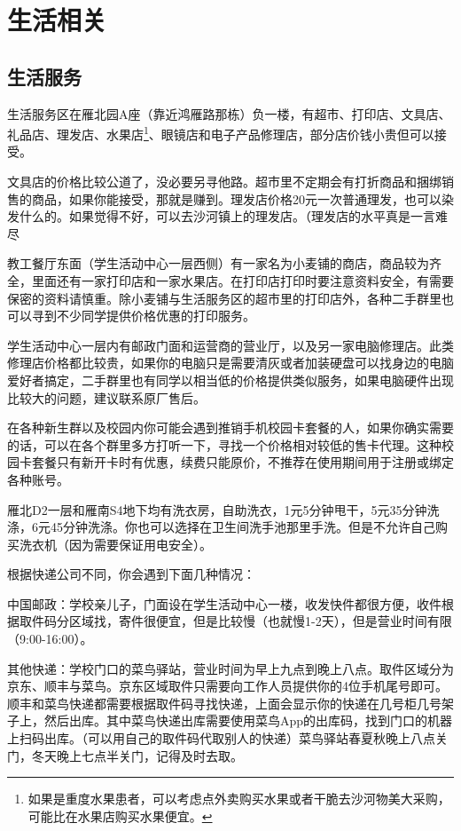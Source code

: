 \section{生活相关}

\subsection{生活服务}


生活服务区在雁北园A座（靠近鸿雁路那栋）负一楼，有超市、打印店、文具店、礼品店、理发店、水果店\footnote{如果是重度水果患者，可以考虑点外卖购买水果或者干脆去沙河物美大采购，可能比在水果店购买水果便宜。}、眼镜店和电子产品修理店，部分店价钱小贵但可以接受。

文具店的价格比较公道了，没必要另寻他路。超市里不定期会有打折商品和捆绑销售的商品，如果你能接受，那就是赚到。理发店价格20元一次普通理发，也可以染发什么的。如果觉得不好，可以去沙河镇上的理发店。（理发店的水平真是一言难尽

教工餐厅东面（学生活动中心一层西侧）有一家名为小麦铺的商店，商品较为齐全，里面还有一家打印店和一家水果店。在打印店打印时要注意资料安全，有需要保密的资料请慎重。除小麦铺与生活服务区的超市里的打印店外，各种二手群里也可以寻到不少同学提供价格优惠的打印服务。

学生活动中心一层内有邮政门面和运营商的营业厅，以及另一家电脑修理店。此类修理店价格都比较贵，如果你的电脑只是需要清灰或者加装硬盘可以找身边的电脑爱好者搞定，二手群里也有同学以相当低的价格提供类似服务，如果电脑硬件出现比较大的问题，建议联系原厂售后。

在各种新生群以及校园内你可能会遇到推销手机校园卡套餐的人，如果你确实需要的话，可以在各个群里多方打听一下，寻找一个价格相对较低的售卡代理。这种校园卡套餐只有新开卡时有优惠，续费只能原价，不推荐在使用期间用于注册或绑定各种账号。


雁北D2一层和雁南S4地下均有洗衣房，自助洗衣，1元5分钟甩干，5元35分钟洗涤，6元45分钟洗涤。你也可以选择在卫生间洗手池那里手洗。但是不允许自己购买洗衣机（因为需要保证用电安全）。


根据快递公司不同，你会遇到下面几种情况：

中国邮政：学校亲儿子，门面设在学生活动中心一楼，收发快件都很方便，收件根据取件码分区域找，寄件很便宜，但是比较慢（也就慢1-2天），但是营业时间有限（9:00-16:00）。

其他快递：学校门口的菜鸟驿站，营业时间为早上九点到晚上八点。取件区域分为京东、顺丰与菜鸟。京东区域取件只需要向工作人员提供你的4位手机尾号即可。顺丰和菜鸟快递都需要根据取件码寻找快递，上面会显示你的快递在几号柜几号架子上，然后出库。其中菜鸟快递出库需要使用菜鸟App的出库码，找到门口的机器上扫码出库。（可以用自己的取件码代取别人的快递）菜鸟驿站春夏秋晚上八点关门，冬天晚上七点半关门，记得及时去取。


